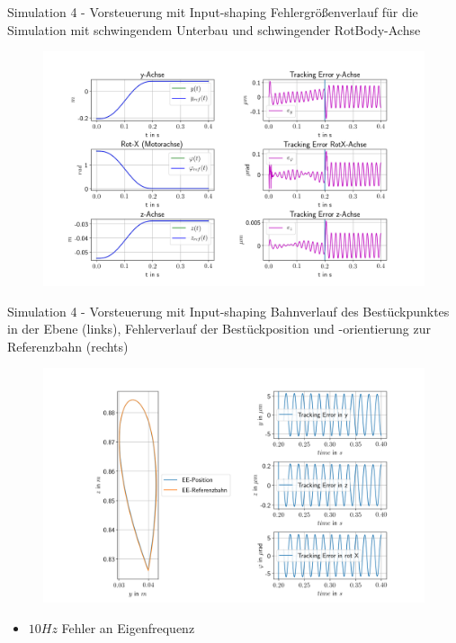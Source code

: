 \documentclass[10pt,xcolor=dvipsnames]{beamer}
\begin{document}
	\begin{frame}{Simulation 4 - Vorsteuerung mit Input-shaping}
		Fehlergrößenverlauf für die Simulation mit schwingendem Unterbau und schwingender RotBody-Achse
		\vspace{-0.2cm}
		\begin{figure}
			\includegraphics[width=0.99\linewidth]{./pics/posVerlaufAchsen_shift.png}
		\end{figure}
	\end{frame}

	\begin{frame}{Simulation 4 - Vorsteuerung mit Input-shaping}
	\vspace{-0.1cm}
		Bahnverlauf des Bestückpunktes in der Ebene (links), Fehlerverlauf der Bestückposition und -orientierung zur Referenzbahn (rechts)
		\vspace{-0.2cm}
		\begin{figure}
		\includegraphics[width=0.9\linewidth]{./pics/endeffektorZoom_shift.png}
		\end{figure}
		\begin{itemize}
			\item $ 10Hz $ Fehler an Eigenfrequenz
		\end{itemize}
	\end{frame}
\end{document}
